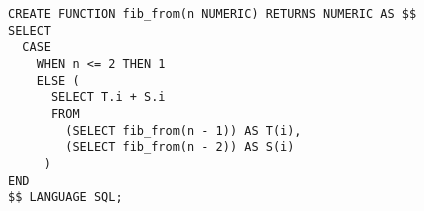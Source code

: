 \begin{verbatim}
CREATE FUNCTION fib_from(n NUMERIC) RETURNS NUMERIC AS $$
SELECT
  CASE
    WHEN n <= 2 THEN 1
    ELSE (
      SELECT T.i + S.i
      FROM
        (SELECT fib_from(n - 1)) AS T(i),
        (SELECT fib_from(n - 2)) AS S(i)
     )
END
$$ LANGUAGE SQL;
\end{verbatim}